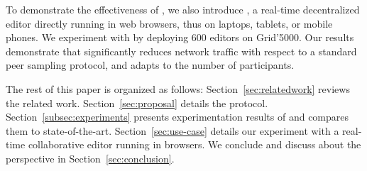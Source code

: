 To demonstrate the effectiveness of \SPRAY, we also introduce \CRATE, a
real-time decentralized editor directly running in web browsers, thus on
laptops, tablets, or mobile phones. We experiment with \CRATE by deploying 600
editors on Grid'5000. Our results demonstrate that \SPRAY significantly reduces
network traffic with respect to a standard peer sampling protocol, and adapts to
the number of participants.

The rest of this paper is organized as follows:
Section~\ref{sec:relatedwork} reviews the related
work. Section~\ref{sec:proposal} details the \SPRAY
protocol. Section~\ref{subsec:experiments} presents experimentation
results of \SPRAY and compares them to
state-of-the-art. Section~\ref{sec:use-case} details our experiment
with \CRATE a real-time collaborative editor running in browsers. We
conclude and discuss about the perspective in
Section~\ref{sec:conclusion}.

